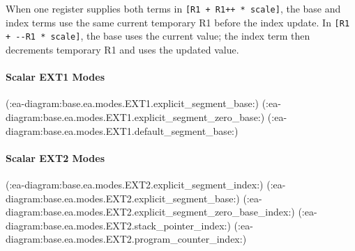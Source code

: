 When one register supplies both terms in \texttt{[R1 + R1++ * scale]}, the base and index terms use the same
current temporary R1 before the index update. In \texttt{[R1 + {-}{-}R1 * scale]}, the base uses the current value;
the index term then decrements temporary R1 and uses the updated value.

\paragraph{Scalar EXT1 Modes}\mbox{}\par
(:ea-diagram:base.ea.modes.EXT1.explicit_segment_base:)
\clearpage
(:ea-diagram:base.ea.modes.EXT1.explicit_segment_zero_base:)
\clearpage
(:ea-diagram:base.ea.modes.EXT1.default_segment_base:)

\clearpage
\paragraph{Scalar EXT2 Modes}\mbox{}\par
(:ea-diagram:base.ea.modes.EXT2.explicit_segment_index:)
\clearpage
(:ea-diagram:base.ea.modes.EXT2.explicit_segment_base:)
\clearpage
(:ea-diagram:base.ea.modes.EXT2.explicit_segment_zero_base_index:)
\clearpage
(:ea-diagram:base.ea.modes.EXT2.stack_pointer_index:)
\clearpage
(:ea-diagram:base.ea.modes.EXT2.program_counter_index:)
